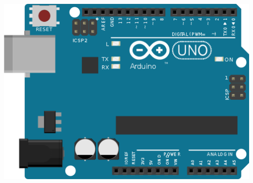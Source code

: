             \begin{center}
                \includegraphics[scale=0.6]{img/arduino-uno-frietzing}
            \end{center}
    
